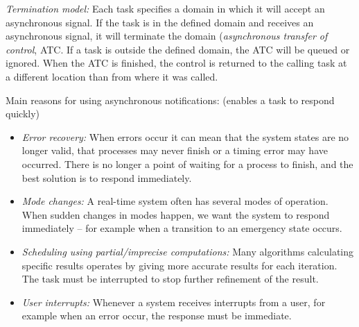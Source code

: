 \textit{Termination model:} Each task specifies a domain in which it will accept an asynchronous signal. If the task is in the defined domain and receives an asynchronous signal, it will terminate the domain (\textit{asynchronous transfer of control}, ATC. If a task is outside the defined domain, the ATC will be queued or ignored. When the ATC is finished, the control is returned to the calling task at a different location than from where it was called.

Main reasons for using asynchronous notifications: (enables a task to respond quickly)
\begin{itemize}
  \item \textit{Error recovery:} When errors occur it can mean that the system states are no longer valid, that processes may never finish or a timing error may have occurred. There is no longer a point of waiting for a process to finish, and the best solution is to respond immediately.
  \item \textit{Mode changes:} A real-time system often has several modes of operation. When sudden changes in modes happen, we want the system to respond immediately -- for example when a transition to an emergency state occurs.
  \item \textit{Scheduling using partial/imprecise computations:} Many algorithms calculating specific results operates by giving more accurate results for each iteration. The task must be interrupted to stop further refinement of the result.
  \item \textit{User interrupts:} Whenever a system receives interrupts from a user, for example when an error occur, the response must be immediate.
\end{itemize}




